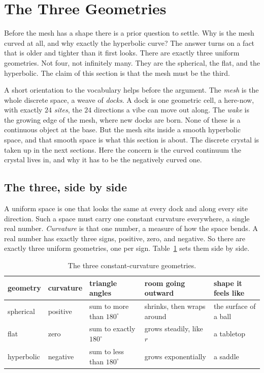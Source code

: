 \section{The Three Geometries}

Before the mesh has a shape there is a prior question to settle. Why is the mesh curved at all, and why exactly the hyperbolic curve? The answer turns on a fact that is older and tighter than it first looks. There are exactly three uniform geometries. Not four, not infinitely many. They are the spherical, the flat, and the hyperbolic. The claim of this section is that the mesh must be the third.

A short orientation to the vocabulary helps before the argument. The \emph{mesh} is the whole discrete space, a weave of \emph{docks}. A dock is one geometric cell, a here-now, with exactly $24$ \emph{sites}, the $24$ directions a vibe can move out along. The \emph{wake} is the growing edge of the mesh, where new docks are born. None of these is a continuous object at the base. But the mesh sits inside a smooth hyperbolic space, and that smooth space is what this section is about. The discrete crystal is taken up in the next sections. Here the concern is the curved continuum the crystal lives in, and why it has to be the negatively curved one.

\subsection{The three, side by side}

A uniform space is one that looks the same at every dock and along every site direction. Such a space must carry one constant curvature everywhere, a single real number. \emph{Curvature} is that one number, a measure of how the space bends. A real number has exactly three signs, positive, zero, and negative. So there are exactly three uniform geometries, one per sign. Table~\ref{tab:three-geometries} sets them side by side.

\begin{table}[ht]
\centering
\begin{tabular}{@{}lllll@{}}
\toprule
geometry & curvature & triangle angles & room going outward & shape it feels like \\
\midrule
spherical & positive & sum to more than $180^\circ$ & shrinks, then wraps around & the surface of a ball \\
flat & zero & sum to exactly $180^\circ$ & grows steadily, like $r$ & a tabletop \\
hyperbolic & negative & sum to less than $180^\circ$ & grows exponentially & a saddle \\
\bottomrule
\end{tabular}
\caption{The three constant-curvature geometries.}
\label{tab:three-geometries}
\end{table}

